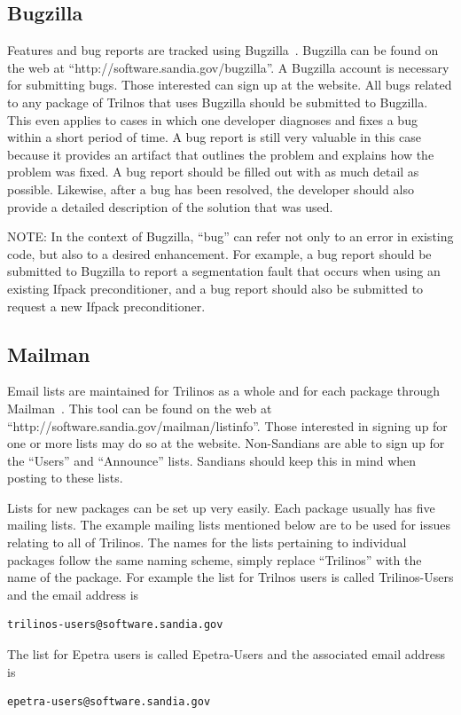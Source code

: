 \documentclass[12pt,relax]{TrilinosDevGuide}
\begin{document}
\subsection{Bugzilla}
\label{subsect:Bugzilla}
Features and bug reports are tracked using Bugzilla~\cite{Bugzilla}.  Bugzilla 
can be found on the web at ``http://software.sandia.gov/bugzilla''.  A 
Bugzilla account is necessary for submitting bugs.  Those interested can sign 
up at the website.  All bugs related to any package of Trilnos that uses 
Bugzilla should be submitted to Bugzilla.  This even applies to cases in which 
one developer diagnoses and fixes a bug within a short period of time.  A bug 
report is still very valuable in this case because it provides an artifact 
that outlines the problem and explains how the problem was fixed.  A bug 
report should be filled out with as much detail as possible.  Likewise, after 
a bug has been resolved, the developer should also provide a detailed 
description of the solution that was used.

NOTE: In the context of Bugzilla, ``bug'' can refer not only to an error in 
existing code, but also to a desired enhancement.  For example, a bug report 
should be submitted to Bugzilla to report a segmentation fault that occurs 
when using an existing Ifpack preconditioner, and a bug report should also be
submitted to request a new Ifpack preconditioner.

\subsection{Mailman}

Email lists are maintained for Trilinos as a whole and for each package 
through Mailman~\cite{Mailman}.  This tool can be found on the web at 
``http://software.sandia.gov/mailman/listinfo''.  Those interested in signing 
up for one or more lists may do so at the website.  Non-Sandians are able to 
sign up for the ``Users'' and ``Announce'' lists.  Sandians should keep this 
in mind when posting to these lists.

Lists for new packages can be set up very easily.  Each package usually has 
five mailing lists.  The example mailing lists mentioned below are to be used 
for issues relating to all of Trilinos.  The names for the lists pertaining to 
individual packages follow the same naming scheme, simply replace ``Trilinos'' 
with the name of the package.  For example the list for Trilnos users is 
called Trilinos-Users and the email address is 
\begin{verbatim}trilinos-users@software.sandia.gov\end{verbatim}  The list 
for Epetra users is called Epetra-Users and the associated email address is 
\begin{verbatim}epetra-users@software.sandia.gov\end{verbatim}
\end{document}
